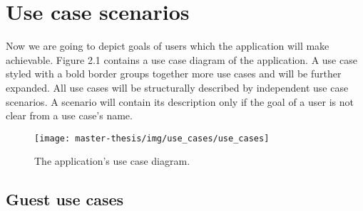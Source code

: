 \section{Use case scenarios}
Now we are going to depict goals of users which the application will make achievable.
Figure 2.1 contains a use case diagram of the application.
A use case styled with a bold border groups together more use cases and will be further expanded.
All use cases will be structurally described by independent use case scenarios.
A scenario will contain its description only if the goal of a user is not clear from a use case's name.


\begin{figure}[h]
  \texttt{[image: master-thesis/img/use\_cases/use\_cases]}
  \caption{The application's use case diagram.}
\end{figure}

\newpage

\def\arraystretch{1.5}

\subsection{Guest use cases}

